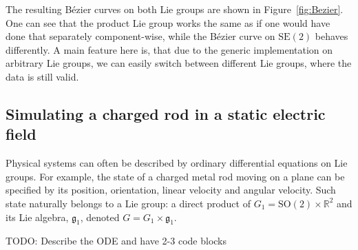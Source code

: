 \documentclass{juliacon}
\begin{document}
The resulting Bézier curves on both Lie groups are shown in Figure~\ref{fig:Bezier}.
One can see that the product Lie group works the same as if one would have done that
separately component-wise, while the Bézier curve on \(\mathrm{SE}(2)\) behaves differently.
A main feature here is, that due to the generic implementation on arbitrary Lie groups,
we can easily switch between different Lie groups, where the data is still valid.

\subsection{Simulating a charged rod in a static electric field}

Physical systems can often be described by ordinary differential equations on Lie groups.
For example, the state of a charged metal rod moving on a plane can be specified by its position, orientation, linear velocity and angular velocity.
Such state naturally belongs to a Lie group: a direct product of \(G_1 = \mathrm{SO}(2) \times \mathbb{R}^2\) and its Lie algebra, \(\mathfrak{g}_1\), denoted \(G = G_1 \times \mathfrak{g}_1\).



{\color{red}TODO: Describe the ODE and have 2-3 code blocks}
\end{document}
